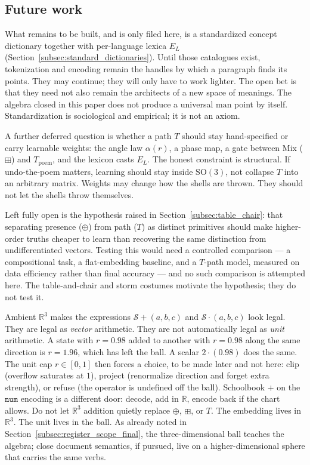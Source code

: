 \documentclass[12pt, a4paper]{article}
\begin{document}
\subsection{Future work}
\label{subsec:future_work}
What remains to be built, and is only filed here, is a standardized
concept dictionary together with per-language lexica $E_L$
(Section~\ref{subsec:standard_dictionaries}). Until those catalogues
exist, tokenization and encoding remain the handles by which a
paragraph finds its points. They may continue; they will only have to
work lighter. The open bet is that they need not also
remain the architects of a new space of meanings.
The algebra closed in this paper does not produce a universal
$\mathrm{man}$ point by itself. Standardization is sociological and
empirical; it is not an axiom.

A further deferred question is whether a path $T$ should stay
hand-specified or carry learnable weights: the angle law
$\alpha(r)$, a phase map, a gate between Mix ($\boxplus$) and
$T_{\mathrm{poem}}$, and the lexicon casts $E_L$. The honest
constraint is structural. If undo-the-poem matters, learning should
stay inside $\mathrm{SO}(3)$, not collapse $T$ into an arbitrary
matrix. Weights may change how the shells are thrown. They should
not let the shells throw themselves.

Left fully open is the hypothesis raised in
Section~\ref{subsec:table_chair}: that separating presence
($\oplus$) from path ($T$) as distinct primitives should make
higher-order truths cheaper to learn than recovering the same
distinction from undifferentiated vectors. Testing this would need a
controlled comparison --- a compositional task, a flat-embedding
baseline, and a $T$-path model, measured on data efficiency rather
than final accuracy --- and no such comparison is attempted here.
The table-and-chair and storm costumes motivate the hypothesis; they
do not test it.

Ambient $\mathbb{R}^3$ makes the expressions
$\mathcal{S}+(a,b,c)$ and $\mathcal{S}\cdot(a,b,c)$ look legal.
They are legal as \emph{vector} arithmetic. They are not automatically
legal as \emph{unit} arithmetic. A state with $r=0.98$ added to
another with $r=0.98$ along the same direction is $r=1.96$, which
has left the ball. A scalar $2\cdot(0.98)$ does the same. The unit
cap $r\in[0,1]$ then forces a choice, to be made later and not
here: clip (overflow saturates at $1$), project (renormalize
direction and forget extra strength), or refuse (the operator is
undefined off the ball). Schoolbook $+$ on the $\mathtt{num}$
encoding is a different door: decode, add in $\mathbb{R}$, encode
back if the chart allows. Do not let $\mathbb{R}^3$ addition
quietly replace $\oplus$, $\boxplus$, or $T$. The embedding
lives in $\mathbb{R}^3$. The unit lives in the ball.
As already noted in Section~\ref{subsec:register_scope_final},
the three-dimensional ball teaches the algebra; close document
semantics, if pursued, live on a higher-dimensional sphere that
carries the same verbs.
\end{document}
